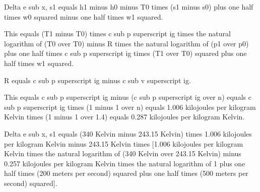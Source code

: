 Delta e sub x, s1 equals h1 minus h0 minus T0 times (s1 minus s0) plus one half times w0 squared minus one half times w1 squared.

This equals (T1 minus T0) times c sub p superscript ig times the natural logarithm of (T0 over T0) minus R times the natural logarithm of (p1 over p0) plus one half times c sub p superscript ig times (T1 over T0) squared plus one half times w1 squared.

R equals c sub p superscript ig minus c sub v superscript ig.

This equals c sub p superscript ig minus (c sub p superscript ig over n) equals c sub p superscript ig times (1 minus 1 over n) equals 1.006 kilojoules per kilogram Kelvin times (1 minus 1 over 1.4) equals 0.287 kilojoules per kilogram Kelvin.

Delta e sub x, s1 equals (340 Kelvin minus 243.15 Kelvin) times 1.006 kilojoules per kilogram Kelvin minus 243.15 Kelvin times [1.006 kilojoules per kilogram Kelvin times the natural logarithm of (340 Kelvin over 243.15 Kelvin) minus 0.257 kilojoules per kilogram Kelvin times the natural logarithm of 1 plus one half times (200 meters per second) squared plus one half times (500 meters per second) squared].